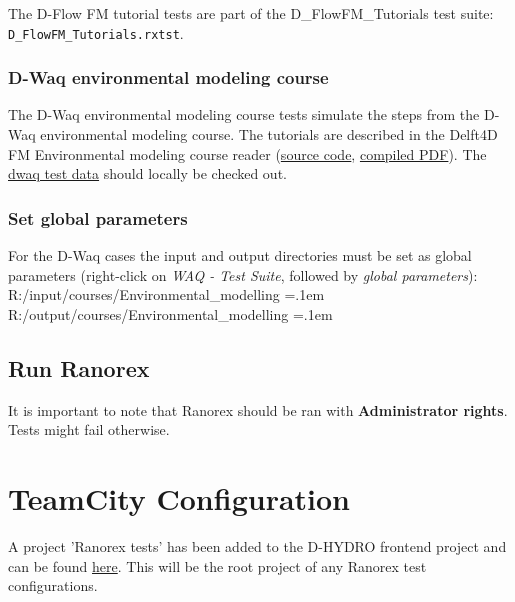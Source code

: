 \documentclass{article}
\newenvironment{lcverbatim}
 {\SaveVerbatim{cverb}}
 {\endSaveVerbatim
  \flushleft\fboxrule=0pt\fboxsep=.1em
  \colorbox{cverbbg}{%
    \makebox[\dimexpr\linewidth-2\fboxsep][l]{\BUseVerbatim{cverb}}%
  }
  \endflushleft
}
\newcommand{\inlverb}[1]{\colorbox{cverbbg}{\texttt{#1}}}
\begin{document}
The D-Flow FM tutorial tests are part of the D\_FlowFM\_Tutorials test suite: \inlverb{D\_FlowFM\_Tutorials.rxtst}.


\subsubsection{D-Waq environmental modeling course}\label{sec:dwaq_env_mod}
The D-Waq environmental modeling course tests simulate the steps from the D-Waq environmental modeling course. The tutorials are described in the Delft4D FM Environmental modeling course reader (\href{https://repos.deltares.nl/repos/ds/trunk/doc/course_academy/delft3dm_environmental_modelling/reader}{source code}, \href{https://dpcbuild.deltares.nl/buildConfiguration/DsDoc_ManualsValdationFunctionalityDocuments_ManualsLatexPdfRelease?}{compiled PDF}).
The \href{https://repos.deltares.nl/repos/ds/trunk/doc/course_academy/delft3dm_environmental_modelling/exercises/input}{dwaq test data} should locally be checked out.



\subsubsection{Set global parameters}\label{sec:global_parameters}
For the D-Waq cases the input and output directories must be set as global parameters (right-click on \textit{WAQ - Test Suite}, followed by \textit{global parameters}):
\begin{lcverbatim}
    R:/input/courses/Environmental_modelling
\end{lcverbatim}
\begin{lcverbatim}
    R:/output/courses/Environmental_modelling
\end{lcverbatim}


\subsection{Run Ranorex}
It is important to note that Ranorex should be ran with \textbf{Administrator rights}. Tests might fail otherwise.

\section{TeamCity Configuration}

A project 'Ranorex tests' has been added to the D-HYDRO frontend project and can be found \href{https://dpcbuild.deltares.nl/project/DHydroUserInterface_DHydro_AutomatedTests_RanorexTests?mode=builds}{here}. This will be the root project of any Ranorex test configurations. 
\end{document}

